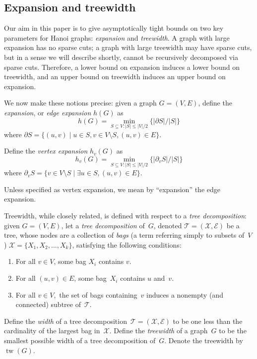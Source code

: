 \documentclass[
final
]{dmtcs-episciences}
\newcommand{\tw}{\operatorname{tw}}
\begin{document}
\subsection{Expansion and treewidth}
\label{sec:exptw}
Our aim in this paper is to give asymptotically tight bounds on two key parameters for Hanoi graphs: \emph{expansion} and \emph{treewidth}. A graph with large expansion has no sparse cuts; a graph with large treewidth may have sparse cuts, but in a sense we will describe shortly, cannot be recursively decomposed via sparse cuts. Therefore, a lower bound on expansion induces a lower bound on treewidth, and an upper bound on treewidth induces an upper bound on expansion.

We now make these notions precise: given a graph $G = (V, E)$, define the \emph{expansion}, or \emph{edge expansion} $h(G)$ as
\[
  h(G) = \min_{S \subseteq V: |S| \leq |V|/2}\{|\partial S|/|S|\}
\]
where $\partial S = \{(u, v) \mid u \in S, v \in V \setminus S, (u, v) \in E\}$.

Define the \emph{vertex expansion} $h_v(G)$ as
\[
  h_v(G) = \min_{S \subseteq V: |S| \leq |V|/2}\{|\partial_v S|/|S|\}
\]
where $\partial_v S = \{v \in V \setminus S \mid \exists u \in S, (u, v) \in E\}$.

Unless specified as vertex expansion, we mean by ``expansion'' the edge expansion.

Treewidth, while closely related, is defined with respect to a \emph{tree decomposition}: given $G = (V, E)$, let a \emph{tree decomposition} of~$G$, denoted $\mathcal{T} = (\mathcal{X}, \mathcal{E})$ be a tree, whose nodes are a collection of \emph{bags} (a term referring simply to subsets of~$V$) $\mathcal{X} = \{X_1, X_2, \dots, X_k\}$, satisfying the following conditions:
\begin{enumerate}
    \item For all $v \in V$, some bag $X_i$ contains $v$.
    \item For all $(u, v) \in E$, some bag~$X_i$ contains $u$ and~$v$.
    \item For all $v \in V,$ the set of bags containing~$v$ induces a nonempty (and connected) subtree of~$\mathcal{T}$.
\end{enumerate}
Define the \emph{width} of a tree decomposition~$\mathcal{T} = (\mathcal{X}, \mathcal{E})$ to be one less than the cardinality of the largest bag in~$\mathcal{X}$. Define the \emph{treewidth} of a graph~$G$ to be the smallest possible width of a tree decomposition of~$G$. Denote the treewidth by $\tw(G)$.
\end{document}
